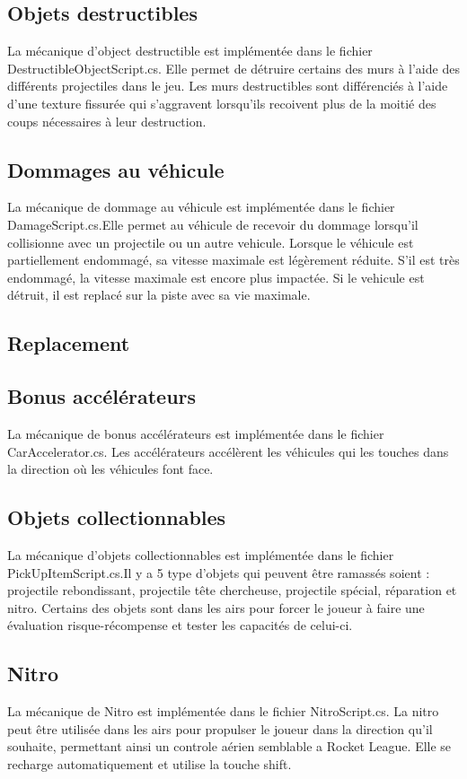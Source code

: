\documentclass[a4paper, 12pt]{article} %
\begin{document}
\subsection{Objets destructibles}
La mécanique d'object destructible est implémentée dans le fichier DestructibleObjectScript.cs. Elle permet de détruire certains des murs à l'aide des différents projectiles dans le jeu. Les murs destructibles sont différenciés à l'aide d'une texture fissurée qui s'aggravent lorsqu'ils recoivent plus de la moitié des coups nécessaires à leur destruction.
\subsection{Dommages au véhicule}
La mécanique de dommage au véhicule est implémentée dans le fichier DamageScript.cs.Elle permet au véhicule de recevoir du dommage lorsqu'il collisionne avec un projectile ou un autre vehicule. Lorsque le véhicule est partiellement endommagé, sa vitesse maximale est légèrement réduite. S'il est très endommagé, la vitesse maximale est encore plus impactée. Si le vehicule est détruit, il est replacé sur la piste avec sa vie maximale.
\subsection{Replacement}
\subsection{Bonus accélérateurs}
La mécanique de bonus accélérateurs est implémentée dans le fichier CarAccelerator.cs. Les accélérateurs accélèrent les véhicules qui les touches dans la direction où les véhicules font face.
\subsection{Objets collectionnables}
La mécanique d'objets collectionnables est implémentée dans le fichier PickUpItemScript.cs.Il y a 5 type d'objets qui peuvent être ramassés soient : projectile rebondissant, projectile tête chercheuse, projectile spécial, réparation et nitro. Certains des objets sont dans les airs pour forcer le joueur à faire une évaluation risque-récompense et tester les capacités de celui-ci.
\subsection{Nitro}
La mécanique de Nitro est implémentée dans le fichier NitroScript.cs. La nitro peut être utilisée dans les airs pour propulser le joueur dans la direction qu'il souhaite, permettant ainsi un controle aérien semblable a Rocket League. Elle se recharge automatiquement et utilise la touche shift.
\end{document}
